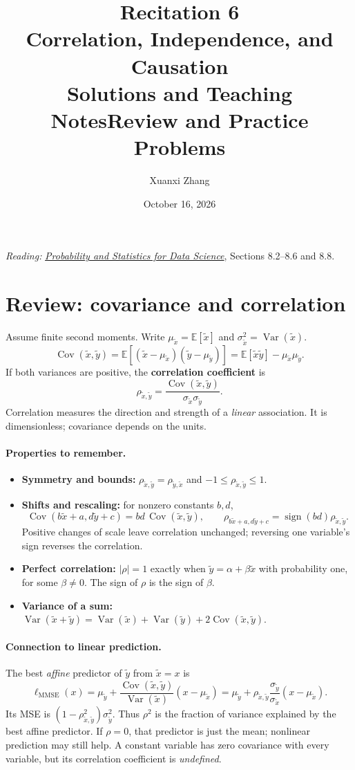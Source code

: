 \documentclass[11pt]{article}
\title{\huge Recitation 6\\[0.35em]
  \normalsize Correlation, Independence, and Causation\\[0.35em]
  \large\ifsolutions Solutions and Teaching Notes\else Review and Practice Problems\fi}
\author{Xuanxi Zhang}
\date{October 16, 2026}
\newcommand{\E}{\mathbb{E}}
\newcommand{\Var}{\operatorname{Var}}
\newcommand{\Cov}{\operatorname{Cov}}
\newcommand{\rv}[1]{\widetilde{#1}}
\newcommand{\lmmse}{\ell_{\mathrm{MMSE}}}
\begin{document}
\maketitle
\noindent\textit{Reading:}
\href{https://github.com/cfgranda/ps4ds/blob/main/ps4ds_preprint.pdf}
{\emph{Probability and Statistics for Data Science}},
Sections 8.2--8.6 and 8.8.

\section{Review: covariance and correlation}
Assume finite second moments. Write
$\mu_{\rv{x}}=\E[\rv{x}]$ and $\sigma_{\rv{x}}^2=\Var(\rv{x})$.
\[
  \Cov(\rv{x},\rv{y})
  =\E[(\rv{x}-\mu_{\rv{x}})(\rv{y}-\mu_{\rv{y}})]
  =\E[\rv{x}\rv{y}]-\mu_{\rv{x}}\mu_{\rv{y}}.
\]
If both variances are positive, the \textbf{correlation coefficient} is
\[
  \boxed{\rho_{\rv{x},\rv{y}}
    =\frac{\Cov(\rv{x},\rv{y})}{\sigma_{\rv{x}}\sigma_{\rv{y}}}.}
\]
Correlation measures the direction and strength of a \emph{linear}
association. It is dimensionless; covariance depends on the units.

\paragraph{Properties to remember.}
\begin{itemize}
  \item \textbf{Symmetry and bounds:}
    $\rho_{\rv{x},\rv{y}}=\rho_{\rv{y},\rv{x}}$ and
    $-1\leq\rho_{\rv{x},\rv{y}}\leq1$.
  \item \textbf{Shifts and rescaling:} for nonzero constants $b,d$,
    \[
      \Cov(b\rv{x}+a,d\rv{y}+c)=bd\,\Cov(\rv{x},\rv{y}),\qquad
      \rho_{b\rv{x}+a,d\rv{y}+c}
      =\operatorname{sign}(bd)\rho_{\rv{x},\rv{y}}.
    \]
    Positive changes of scale leave correlation unchanged; reversing one
    variable's sign reverses the correlation.
  \item \textbf{Perfect correlation:} $|\rho|=1$ exactly when
    $\rv{y}=\alpha+\beta\rv{x}$ with probability one, for some
    $\beta\ne0$. The sign of $\rho$ is the sign of $\beta$.
  \item \textbf{Variance of a sum:}
    $\Var(\rv{x}+\rv{y})=\Var(\rv{x})+\Var(\rv{y})
      +2\Cov(\rv{x},\rv{y})$.
\end{itemize}

\paragraph{Connection to linear prediction.}
The best \emph{affine} predictor of $\rv{y}$ from $\rv{x}=x$ is
\[
  \lmmse(x)=\mu_{\rv{y}}
     +\frac{\Cov(\rv{x},\rv{y})}{\Var(\rv{x})}(x-\mu_{\rv{x}})
  =\mu_{\rv{y}}+\rho_{\rv{x},\rv{y}}
     \frac{\sigma_{\rv{y}}}{\sigma_{\rv{x}}}(x-\mu_{\rv{x}}).
\]
Its MSE is $(1-\rho_{\rv{x},\rv{y}}^2)\sigma_{\rv{y}}^2$.
Thus $\rho^2$ is the fraction of variance explained by the best affine
predictor. If $\rho=0$, that predictor is just the mean; nonlinear
prediction may still help. A constant variable has zero covariance with
every variable, but its correlation coefficient is \emph{undefined}.
\end{document}
